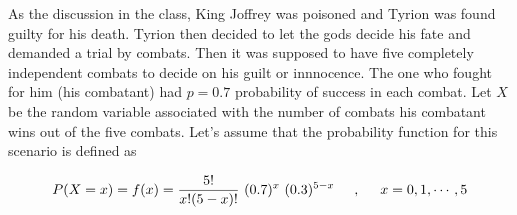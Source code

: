 \documentclass[addpoints]{examsetup}
\begin{document}
\begin{questions}
\begin{table}[h!]
\begin{tabular}{llllll}
     \end{tabular}
  \end{table}
         
\pagebreak

\question
As the discussion in the class, King Joffrey was poisoned and Tyrion was found guilty  for his death. Tyrion then decided to let the gods decide his fate and demanded a trial by combats. Then it was supposed to have five completely independent combats to decide on his guilt or innnocence. The one who fought for him (his combatant) had $p= 0.7$ probability of success in each combat.  Let $X$ be the random variable associated with the number of combats his combatant wins out of the five combats. Let's assume that the probability function for this scenario is defined as 



$$P(X=x) = f(x)= \frac{5!}{ x! (5-x)! } \ (0.7)^{x}\  (0.3)^{5-x} \hspace{.5cm},\hspace{.5cm} x= 0, 1, \cdots, 5 $$
               


\end{questions}
\end{document}
